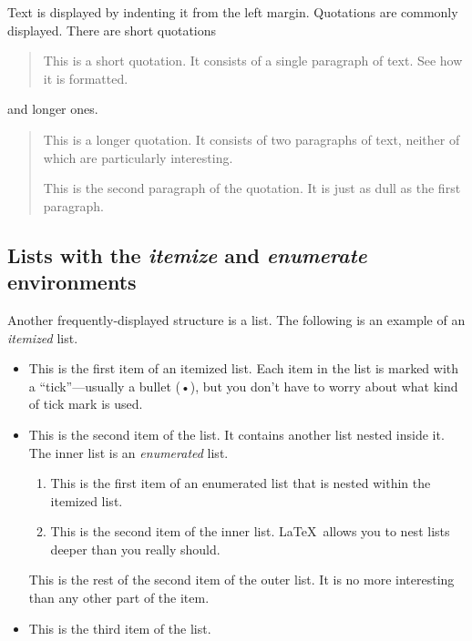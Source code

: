 \documentclass{article}      %
\begin{document}
Text is displayed by indenting it from the left margin.  Quotations are commonly displayed.  There
are short quotations
\begin{quote}
   This is a short quotation.  It consists of a single paragraph of text.  See how it is formatted.
\end{quote}
and longer ones.
\begin{quotation}
   This is a longer quotation.  It consists of two paragraphs of text, neither of which are
   particularly interesting.

   This is the second paragraph of the quotation.  It is just as dull as the first paragraph.
\end{quotation}

\subsection{Lists with the \emph{itemize} and \emph{enumerate} environments}

Another frequently-displayed structure is a list. The following is an example of an 
\emph{itemized} list.

\begin{itemize}
   
   \item This is the first item of an itemized list. Each item in the list is marked with a
    ``tick''—usually a bullet (•), but you don't have to worry about what kind of tick mark is
    used.

   \item This is the second item of the list.  It contains another list nested inside it.  The inner
    list is an \emph{enumerated} list.
         \begin{enumerate}
            \item This is the first item of an enumerated list that is nested within the itemized
             list.

            \item This is the second item of the inner list. \LaTeX\ allows you to nest lists deeper
             than you really should.
         \end{enumerate}
         This is the rest of the second item of the outer list.  It is no more interesting than any
         other part of the item.
   
   \item This is the third item of the list.
\end{itemize}
\end{document}
